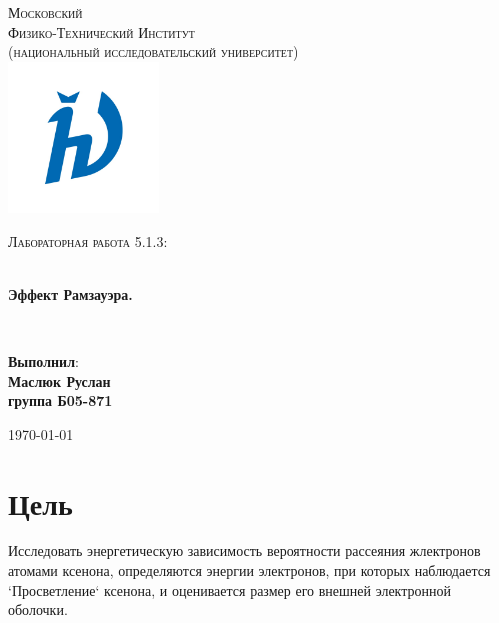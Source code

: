 \documentclass[a4paper,14pt]{extarticle}
\begin{document}
\begin{titlepage}
\begin{center}

\textsc{\LARGE Московский\\[-0.2cm]Физико-Технический Институт\\[0.1cm]\large (национальный исследовательский университет)}\\[1.5cm] 

\includegraphics[width=0.3\textwidth]{logo}

\textsc{\Large Лабораторная работа 5.1.3: \\ }

\HRule \\[0.4cm]
{ \LARGE \bfseries Эффект Рамзауэра. }

\HRule \\[1.5cm]

\noindent
\begin{minipage}{0.4\textwidth}
\begin{flushleft} \large
\end{flushleft}
\end{minipage}%
\begin{minipage}{0.4\textwidth}
\begin{flushright} \large
\end{flushright}
\end{minipage}

\large{\begin{flushright}
\vfill
\textbf{Выполнил}:\\
\textbf{Маслюк Руслан\\}
\textbf{группа Б05-871}
\end{flushright}}

{\large \today}\\

\end{center}
\end{titlepage}




\section{Цель} %
\label{sec:цель}
Исследовать энергетическую зависимость вероятности рассеяния жлектронов атомами ксенона, определяются энергии электронов, при которых наблюдается `Просветление` ксенона, и оценивается размер его внешней электронной оболочки.
\end{document}
